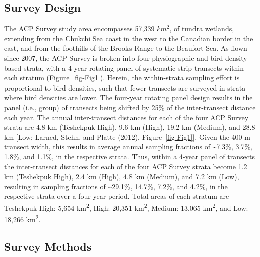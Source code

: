 \documentclass[
]{article}
\begin{document}
\subsection*{Survey Design}\label{survey-design}

The ACP Survey study area encompasses 57,339 \(km^2\), of tundra
wetlands, extending from the Chukchi Sea coast in the west to the
Canadian border in the east, and from the foothills of the Brooks Range
to the Beaufort Sea. As flown since 2007, the ACP Survey is broken into
four physiographic and bird-density-based strata, with a 4-year rotating
panel of systematic strip-transects within each stratum
(Figure~\ref{fig-Fig1}). Herein, the within-strata sampling effort is
proportional to bird densities, such that fewer transects are surveyed
in strata where bird densities are lower. The four-year rotating panel
design results in the panel (i.e., group) of transects being shifted by
25\% of the inter-transect distance each year. The annual inter-transect
distances for each of the four ACP Survey strata are 4.8 km (Teshekpuk
High), 9.6 km (High), 19.2 km (Medium), and 28.8 km {[}Low; Larned,
Stehn, and Platte (2012), Figure~\ref{fig-Fig1}{]}. Given the 400 m
transect width, this results in average annual sampling fractions of
\textasciitilde7.3\%, 3.7\%, 1.8\%, and 1.1\%, in the respective strata.
Thus, within a 4-year panel of transects the inter-transect distances
for each of the four ACP Survey strata become 1.2 km (Teshekpuk High),
2.4 km (High), 4.8 km (Medium), and 7.2 km (Low), resulting in sampling
fractions of \textasciitilde29.1\%, 14.7\%, 7.2\%, and 4.2\%, in the
respective strata over a four-year period. Total areas of each stratum
are Teshekpuk High: 5,654 km\textsuperscript{2}, High: 20,351
km\textsuperscript{2}, Medium: 13,065 km\textsuperscript{2}, and Low:
18,266 km\textsuperscript{2}.

\subsection*{Survey Methods}\label{survey-methods}
\end{document}
